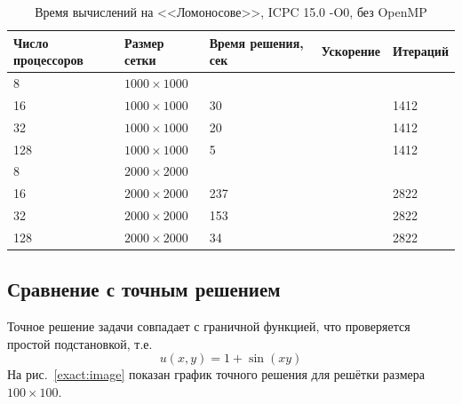 \documentclass[12pt,notitlepage,oneside]{extarticle}
\begin{document}
\begin{table}[h]
\centering
\caption{Время вычислений на <<Ломоносове>>, ICPC 15.0 -O0, без OpenMP}
\label{lomO0:table}
\begin{tabular}{|l|l|l|l|l|}
\textbf{Число процессоров} & \textbf{Размер сетки} & \textbf{Время решения, сек} & \textbf{Ускорение} & \textbf{Итераций}      \\  \hline
8                          & $1000 \times 1000 $        &                             &                    &                        \\
16                         & $1000 \times 1000 $        & 30                          &                    & 1412                   \\
32                         & $1000 \times 1000 $        & 20                          &                    & 1412                   \\
128                        & $1000 \times 1000 $        & 5                           &                    & 1412                   \\ \hline
8                          & $2000 \times 2000 $        &                             &                    &                        \\
16                         & $2000 \times 2000 $        & 237                         &                    & 2822                   \\
32                         & $2000 \times 2000 $        & 153                         &                    & 2822                   \\
128                        & $2000 \times 2000 $        & 34                          &                    & 2822
\end{tabular}
\end{table}

\subsection{Сравнение с точным решением}
Точное решение задачи совпадает с граничной функцией, что проверяется простой
подстановкой, т.е.
\[
  u(x, y) = 1 + \sin(xy)
\]
На рис.~\ref{exact:image} показан график точного решения для решётки размера
$100 \times 100$.
\end{document}
